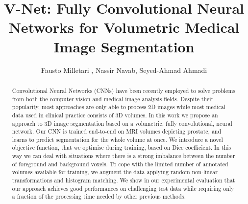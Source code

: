 \documentclass{llncs}
\begin{document}
%
\frontmatter          %
%
\pagestyle{headings}  %
%
\mainmatter              %
%
\title{V-Net: Fully Convolutional Neural Networks for Volumetric Medical Image Segmentation}
%


\author{Fausto Milletari ,
	Nassir Navab,
	Seyed-Ahmad Ahmadi 
}



\maketitle              %


\begin{abstract}
Convolutional Neural Networks (CNNs) have been recently employed to solve problems from both the computer vision and medical image analysis fields. Despite their popularity, most approaches are only able to process 2D images while most medical data used in clinical practice consists of 3D volumes. In this work we propose an approach to 3D image segmentation based on a volumetric, fully convolutional, neural network. Our CNN is trained end-to-end on MRI volumes depicting prostate, and learns to predict segmentation for the whole volume at once. We introduce a novel objective function, that we optimise during training, based on Dice coefficient. In this way we can deal with situations where there is a strong imbalance between the number of foreground and background voxels. To cope with the limited number of annotated volumes available for training, we augment the data applying random non-linear transformations and histogram matching. We show in our experimental evaluation that our approach achieves good performances on challenging test data while requiring only a fraction of the processing time needed by other previous methods.
\end{abstract}













\end{document}
